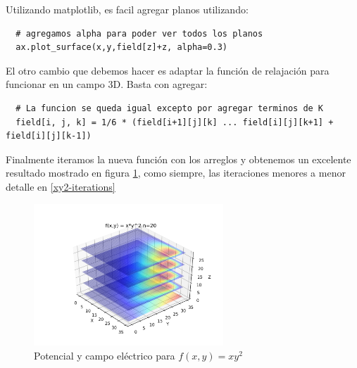 \documentclass[10pt,journal,compsoc]{IEEEtran}
\begin{document}
Utilizando matplotlib, es facil agregar planos utilizando:

\begin{lstlisting}
  # agregamos alpha para poder ver todos los planos
  ax.plot_surface(x,y,field[z]+z, alpha=0.3)
\end{lstlisting}

El otro cambio que debemos hacer es adaptar la función de relajación para funcionar en un campo 3D.
Basta con agregar:
\begin{lstlisting}
  # La funcion se queda igual excepto por agregar terminos de K
  field[i, j, k] = 1/6 * (field[i+1][j][k] ... field[i][j][k+1] + field[i][j][k-1])
\end{lstlisting}

Finalmente iteramos la nueva función con los arreglos y obtenemos un excelente resultado mostrado en 
figura \ref{xy2-n20}, como siempre, las iteraciones menores a menor detalle en \ref{xy2-iterations}

\begin{figure}
  \centering
  \includegraphics[width=2.8in]{images/xy2-n20}
  \caption{Potencial y campo eléctrico para \(f(x,y) = xy^2\)}
  \label{xy2-n20}
\end{figure}
\end{document}
